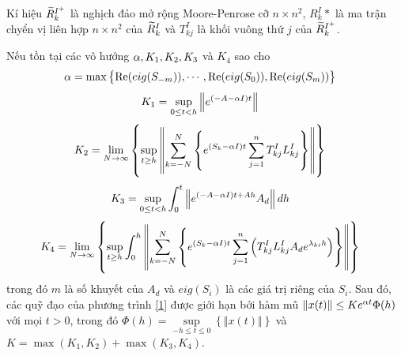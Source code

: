 % 
Kí hiệu $\widetilde{R}_k^{I^+}$ là nghịch đảo mở rộng Moore-Penrose cỡ $n \times n^2$, $R^I_k*$ là ma trận chyển vị liên hợp $n \times n^2$ của $\widetilde{R}^I_k$ và $T_{kj}^I$ là khối vuông thứ $j$ của $\widetilde{R}_k^{I^+}$.\\
%
\begin{dly}\label{dly1}
Nếu tồn tại các vô hướng $\alpha, K_1, K_2, K_3$ và $K_4$ sao cho
\begin{align}\label{17}
	&\alpha = \max \left\{\mathrm{Re}(eig(S_{-m})), \cdots, \mathrm{Re}(eig(S_{0})), \mathrm{Re}(eig(S_{m})) \right\}
\end{align}
\begin{align}\label{18}
	&K_1 = \sup\limits_{0 \le t <h} \left \Vert e^{(-A - \alpha I)t} \right\Vert
\end{align}
\begin{align}\label{19}
	&K_2 = \lim\limits_{N \to \infty} \left\{ \sup\limits_{t \ge h} \left\Vert \sum_{k=-N}^{N} \left\{e^{(S_k-\alpha I)t} \sum_{j=1}^{n} T^I_{kj}L^I_{kj}\right\} \right\Vert\right\}
\end{align}	
\begin{align}\label{20}
	&K_3 = \sup \limits_{0 \le t <h} \int_0^t \left\Vert e^{(-A-\alpha I)t +A h }A_d \right\Vert dh  
\end{align}
\begin{align}\label{21}
	&K_4 = \lim\limits_{N \to \infty} \left\{\sup\limits_{t \ge h} \int_{0}^{h} \left \Vert \sum_{k=-N}^{N} \left\{e^{(S_k-\alpha I)t} \sum_{j =1}^{n} \left(T^I_{kj}L^I_{kj}A_de^{\lambda_{ki}h } \right) \right\} \right \Vert \right\}
\end{align}
%
trong đó $m$ là số khuyết của $A_d$ và $eig(S_i)$ là các giá trị riêng của $S_i$. Sau đó, các quỹ đạo của phương trình \ref{1} được giới hạn bởi hàm mũ $\Vert x(t) \Vert \le Ke^{\alpha t}\Phi(h)$ với mọi $t >0$, trong đó $\Phi(h) = \sup\limits_{-h \le t \le 0} \left\{\Vert x(t) \Vert \right\} $ và $K = \max (K_1, K_2) + \max(K_3, K_4)$.
\end{dly}
